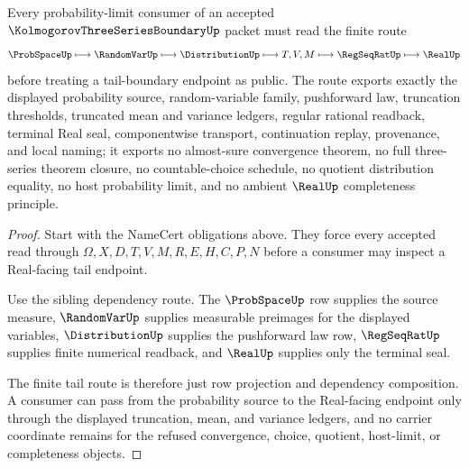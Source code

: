 \begin{theorem}
\label{thm:kolmogorov-three-series-boundary-finite-tail-route}
Every probability-limit consumer of an accepted $\KolmogorovThreeSeriesBoundaryUp$ packet must read the finite route
$$
\ProbSpaceUp \longmapsto \RandomVarUp \longmapsto \DistributionUp \longmapsto T,V,M \longmapsto \RegSeqRatUp \longmapsto \RealUp
$$
before treating a tail-boundary endpoint as public. The route exports exactly the displayed probability source, random-variable family, pushforward law, truncation thresholds, truncated mean and variance ledgers, regular rational readback, terminal Real seal, componentwise transport, continuation replay, provenance, and local naming; it exports no almost-sure convergence theorem, no full three-series theorem closure, no countable-choice schedule, no quotient distribution equality, no host probability limit, and no ambient $\RealUp$ completeness principle.
\end{theorem}
\begin{proof}
Start with the NameCert obligations above. They force every accepted read through $\Omega,X,D,T,V,M,R,E,H,C,P,N$ before a consumer may inspect a Real-facing tail endpoint.

Use the sibling dependency route. The $\ProbSpaceUp$ row supplies the source measure, $\RandomVarUp$ supplies measurable preimages for the displayed variables, $\DistributionUp$ supplies the pushforward law row, $\RegSeqRatUp$ supplies finite numerical readback, and $\RealUp$ supplies only the terminal seal.

The finite tail route is therefore just row projection and dependency composition. A consumer can pass from the probability source to the Real-facing endpoint only through the displayed truncation, mean, and variance ledgers, and no carrier coordinate remains for the refused convergence, choice, quotient, host-limit, or completeness objects.
\end{proof}



